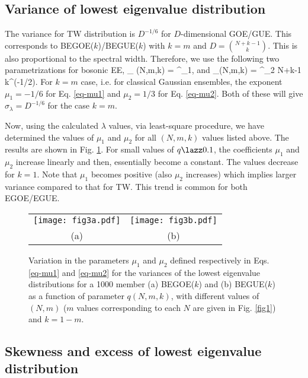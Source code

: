 \subsection{Variance of lowest eigenvalue distribution}

The variance for TW distribution is $D^{-1/6}$ for $D$-dimensional GOE/GUE. This corresponds to BEGOE($k$)/BEGUE($k$) with $k = m$ and $D = \binom{N+k-1}{k}$. This is also proportional to the spectral width. Therefore, we use the following two parametrizations for bosonic EE, 
\be
\sigma_{\lambda} (N,m,k) = ^{\mu_1},
\label{eq-mu1}
\ee
and
\be
\sigma_{\lambda}(N,m,k) = {}^{\mu_2} {N+k-1 \choose k}^{(-1/2)}.
\label{eq-mu2}
\ee
For $k=m$ case, i.e. for classical Gaussian ensembles, the exponent $\mu_1=-1/6$ for Eq. \eqref{eq-mu1} and $\mu_2=1/3$ for Eq. \eqref{eq-mu2}. Both of these will give $\sigma_{\lambda}=D^{-1/6}$ for the case $k=m$.

Now, using the calculated $\lambda$ values, via least-square procedure, we have determined the values of $\mu_1$ and $\mu_2$ for all $(N,m,k)$ values listed above. The results are shown in Fig. \ref{fig3}. For small values of $q \lazz 0.1$, the coefficients $\mu_1$ and $\mu_2$ increase linearly and then, essentially become a constant. The values decrease for $k =1$. Note that $\mu_1$ becomes positive (also $\mu_2$ increases) which implies larger variance compared to that for TW. This trend is common for both EGOE/EGUE.

\begin{figure}[tbh]
	\begin{center}
		\begin{tabular}{cc}
			\texttt{[image: fig3a.pdf]}&\texttt{[image: fig3b.pdf]}\\
			(a) &(b)
		\end{tabular}
	\end{center}
	\caption{Variation in the parameters $\mu_1$ and $\mu_2$ defined respectively in Eqs. \eqref{eq-mu1} and \eqref{eq-mu2} for the variances of the lowest eigenvalue distributions for a 1000 member  (a) BEGOE($k$) and (b) BEGUE($k$) as a function of parameter $q(N,m,k)$,  with different values of $(N,m)$ ($m$ values corresponding to each $N$ are given in Fig. \ref{fig1}) and $k = 1-m$.  }
		\label{fig3}	
\end{figure}

\subsection{Skewness and excess of lowest eigenvalue distribution}

